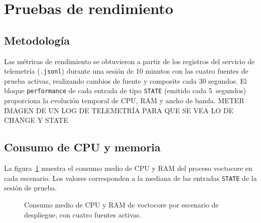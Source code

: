 \section{Pruebas de rendimiento}
\label{sec:rendimiento}

\subsection{Metodología}

Las métricas de rendimiento se obtuvieron a partir de los registros del servicio de
telemetría (\texttt{.jsonl}) durante una sesión de 10 minutos con las cuatro fuentes
de prueba activas, realizando cambios de fuente y composite cada 30 segundos. El
bloque \texttt{performance} de cada entrada de tipo \texttt{STATE} (emitido cada
5~segundos) proporciona la evolución temporal de CPU, RAM y ancho de banda.
METER IMAGEN DE UN LOG DE TELEMETRÍA PARA QUE SE VEA LO DE CHANGE Y STATE

\subsection{Consumo de CPU y memoria}

La figura~\ref{fig:cpu_ram} muestra el consumo medio de CPU y RAM del proceso
voctocore en cada escenario. Los valores corresponden a la mediana de las entradas
\texttt{STATE} de la sesión de prueba.

\begin{figure}[H]
  \centering
  \caption{Consumo medio de CPU y RAM de voctocore por escenario de despliegue,
           con cuatro fuentes activas.}
  \label{fig:cpu_ram}
\end{figure}

